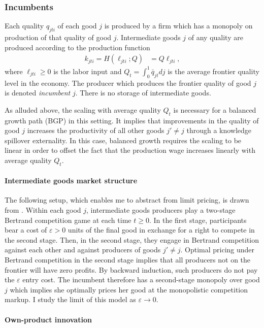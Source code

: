 \documentclass[11pt,english]{article}
\theoremstyle{definition}
\begin{document}
\subsubsection{Incumbents}

Each quality $q_{jti}$ of each good $j$ is produced by a firm which has a monopoly on production of that quality of good $j$. Intermediate goods $j$ of any quality are produced according to the production function
\begin{align}
k_{jti} = H(\ell_{jti};Q) &= Q \ell_{jti}, \label{intermediate_goods_production}
\end{align}
where $\ell_{jti} \ge 0$ is the labor input and $Q_t = \int_0^1 \bar{q}_{jt} dj$ is the average frontier quality level in the economy. The producer which produces the frontier quality of good $j$ is denoted \emph{incumbent} $j$. There is no storage of intermediate goods. 

As alluded above, the scaling with average quality $Q_t$ is necessary for a balanced growth path (BGP) in this setting. It implies that improvements in the quality of good $j$ increases the productivity of all other goods $j' \ne j$ through a knowledge spillover externality. In this case, balanced growth requires the scaling to be linear in order to offset the fact that the production wage increases linearly with average quality $Q_t$.

\paragraph{Intermediate goods market structure} The following setup, which enables me to abstract from limit pricing, is drawn from \cite{akcigit_growth_2018}. Within each good $j$, intermediate goods producers play a two-stage Bertrand competition game at each time $t \ge 0$. In the first stage, participants bear a cost of $\varepsilon > 0$ units of the final good in exchange for a right to compete in the second stage. Then, in the second stage, they engage in Bertrand competition against each other and against producers of goods $j' \ne j$. Optimal pricing under Bertrand competition in the second stage implies that all producers not on the frontier will have zero profits. By backward induction, such producers do not pay the $\varepsilon$ entry cost. The incumbent therefore has a second-stage monopoly over good $j$ which implies she optimally prices her good at the monopolistic competition markup. I study the limit of this model as $\varepsilon \to 0$.

\paragraph{Own-product innovation}\label{subsubsec:OI}
\end{document}
